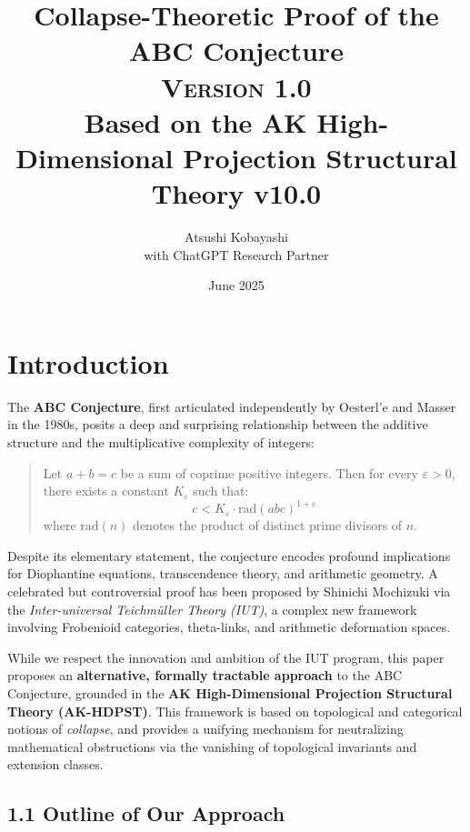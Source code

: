 \documentclass[11pt]{article}
\title{Collapse-Theoretic Proof of the ABC Conjecture\\
\Large \textsc{Version 1.0}\\
\small Based on the AK High-Dimensional Projection Structural Theory v10.0}
\author{Atsushi Kobayashi \\ \small with ChatGPT Research Partner}
\date{June 2025}
\begin{document}
\maketitle
\tableofcontents
\newpage


\section{Introduction}

The \textbf{ABC Conjecture}, first articulated independently by Oesterl'e and Masser in the 1980s, posits a deep and surprising relationship between the additive structure and the multiplicative complexity of integers:
\begin{quote}
    Let $a + b = c$ be a sum of coprime positive integers. Then for every $\varepsilon > 0$, there exists a constant $K_\varepsilon$ such that:
    \[ c < K_\varepsilon \cdot \mathrm{rad}(abc)^{1+\varepsilon} \]
    where $\mathrm{rad}(n)$ denotes the product of distinct prime divisors of $n$.
\end{quote}

Despite its elementary statement, the conjecture encodes profound implications for Diophantine equations, transcendence theory, and arithmetic geometry. A celebrated but controversial proof has been proposed by Shinichi Mochizuki via the \emph{Inter-universal Teichmüller Theory (IUT)}, a complex new framework involving Frobenioid categories, theta-links, and arithmetic deformation spaces.

While we respect the innovation and ambition of the IUT program, this paper proposes an \textbf{alternative, formally tractable approach} to the ABC Conjecture, grounded in the \textbf{AK High-Dimensional Projection Structural Theory (AK-HDPST)}. This framework is based on topological and categorical notions of \emph{collapse}, and provides a unifying mechanism for neutralizing mathematical obstructions via the vanishing of topological invariants and extension classes.

\subsection*{1.1 Outline of Our Approach}
\end{document}

